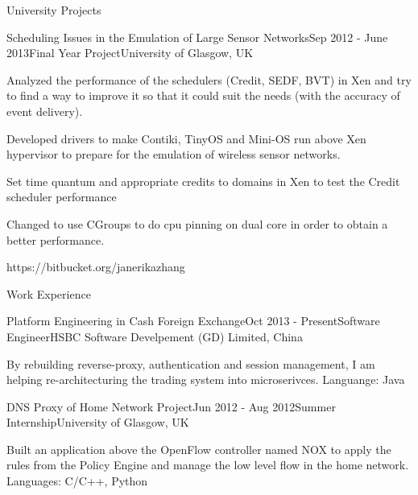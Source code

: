 \documentclass{res4} %
\begin{document}
\begin{rSection}{University Projects}

\begin{rSubsection}{Scheduling Issues in the Emulation of Large Sensor Networks}{Sep 2012 - June 2013}{Final Year Project}{University of Glasgow, UK}
\item Analyzed the performance of the schedulers (Credit, SEDF, BVT) in Xen and try to find a way to improve it so that it could suit the needs (with the accuracy of event delivery).
\item Developed drivers to make Contiki, TinyOS and Mini-OS run above Xen hypervisor to prepare for the emulation of wireless sensor networks.
\item Set time quantum and appropriate credits to domains in Xen to test the Credit scheduler performance
\item Changed to use CGroups to do cpu pinning on dual core in order to obtain a better performance.
\item https://bitbucket.org/janerikazhang
\end{rSubsection}
\end{rSection}

\begin{rSection}{Work Experience}

\begin{rSubsection}{Platform Engineering in Cash Foreign Exchange}{Oct 2013 - Present}{Software Engineer}{HSBC Software Develpement (GD) Limited, China}
\item By rebuilding reverse-proxy, authentication and session management, I am helping re-architecturing the trading system into microserivces. Languange: Java
\end{rSubsection}



\begin{rSubsection}{DNS Proxy of Home Network Project}{Jun 2012 - Aug 2012}{Summer Internship}{University of Glasgow, UK}
\item Built an application above the OpenFlow controller named NOX to apply the rules from the Policy Engine and manage the low level flow in the home network. Languages: C/C++, Python
\end{rSubsection}

\end{rSection}

\end{document}
